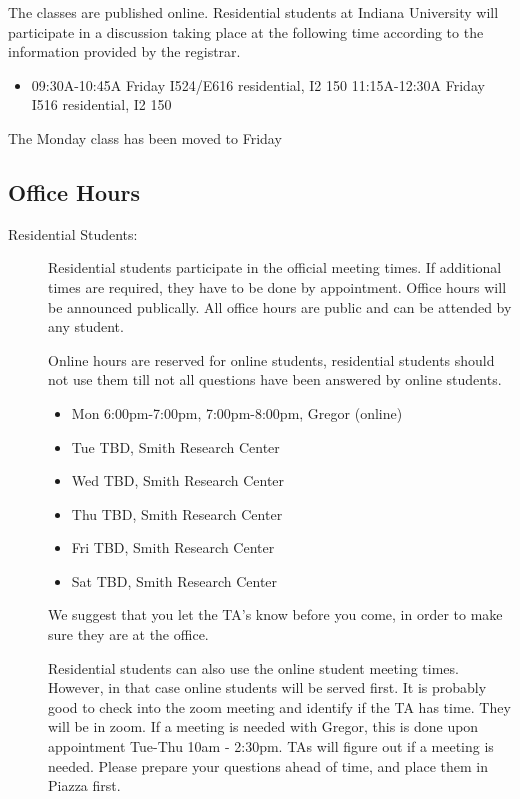 \begin{itemize}
The classes are published online. Residential students at Indiana
University will participate in a discussion taking place at the
following time according to the information provided by the registrar.

\begin{itemize}
\tightlist
\item
  09:30A-10:45A Friday I524/E616 residential, I2 150
  11:15A-12:30A Friday I516 residential, I2 150
\end{itemize}

The Monday class has been moved to Friday

\subsection{Office Hours}\label{office-hours}

\begin{description}
\item[Residential Students:]
Residential students participate in the official meeting times. If
additional times are required, they have to be done by
appointment. Office hours will be announced publically. All office
hours are public and can be attended by any student.

Online hours are reserved for online students, residential students
should not use them till not all questions have been answered by online
students.

\begin{itemize}
\item Mon 6:00pm-7:00pm, 7:00pm-8:00pm, Gregor (online)
\item Tue TBD, Smith Research Center
\item Wed TBD, Smith Research Center
\item Thu TBD, Smith Research Center
\item Fri TBD, Smith Research Center
\item Sat TBD, Smith Research Center
\end{itemize}

We suggest that you let the TA's know before you come, in order to make
sure they are at the office.

Residential students can also use the online student meeting times.
However, in that case online students will be served first. It is
probably good to check into the zoom meeting and identify if the TA
has time. They will be in zoom. If a meeting is needed with Gregor,
this is done upon appointment Tue-Thu 10am - 2:30pm. TAs will figure
out if a meeting is needed.  Please prepare your questions ahead of
time, and place them in Piazza first.



\end{description}
\end{itemize}
